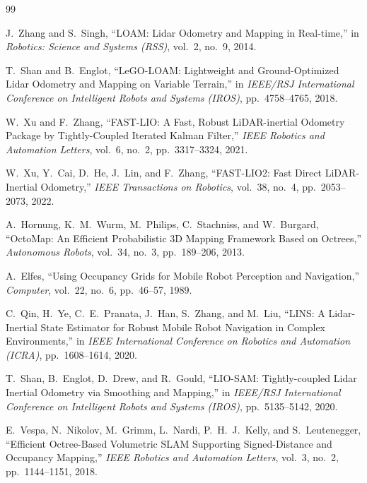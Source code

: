\documentclass[11pt,a4paper]{report}
\begin{document}
\newpage

\begin{thebibliography}{99}

J.~Zhang and S.~Singh, ``LOAM: Lidar Odometry and Mapping in Real-time,'' in \textit{Robotics: Science and Systems (RSS)}, vol.~2, no.~9, 2014.

T.~Shan and B.~Englot, ``LeGO-LOAM: Lightweight and Ground-Optimized Lidar Odometry and Mapping on Variable Terrain,'' in \textit{IEEE/RSJ International Conference on Intelligent Robots and Systems (IROS)}, pp.~4758--4765, 2018.

W.~Xu and F.~Zhang, ``FAST-LIO: A Fast, Robust LiDAR-inertial Odometry Package by Tightly-Coupled Iterated Kalman Filter,'' \textit{IEEE Robotics and Automation Letters}, vol.~6, no.~2, pp.~3317--3324, 2021.

W.~Xu, Y.~Cai, D.~He, J.~Lin, and F.~Zhang, ``FAST-LIO2: Fast Direct LiDAR-Inertial Odometry,'' \textit{IEEE Transactions on Robotics}, vol.~38, no.~4, pp.~2053--2073, 2022.

A.~Hornung, K.~M.~Wurm, M.~Philips, C.~Stachniss, and W.~Burgard, ``OctoMap: An Efficient Probabilistic 3D Mapping Framework Based on Octrees,'' \textit{Autonomous Robots}, vol.~34, no.~3, pp.~189--206, 2013.

A.~Elfes, ``Using Occupancy Grids for Mobile Robot Perception and Navigation,'' \textit{Computer}, vol.~22, no.~6, pp.~46--57, 1989.

C.~Qin, H.~Ye, C.~E.~Pranata, J.~Han, S.~Zhang, and M.~Liu, ``LINS: A Lidar-Inertial State Estimator for Robust Mobile Robot Navigation in Complex Environments,'' in \textit{IEEE International Conference on Robotics and Automation (ICRA)}, pp.~1608--1614, 2020.

T.~Shan, B.~Englot, D.~Drew, and R.~Gould, ``LIO-SAM: Tightly-coupled Lidar Inertial Odometry via Smoothing and Mapping,'' in \textit{IEEE/RSJ International Conference on Intelligent Robots and Systems (IROS)}, pp.~5135--5142, 2020.

E.~Vespa, N.~Nikolov, M.~Grimm, L.~Nardi, P.~H.~J.~Kelly, and S.~Leutenegger, ``Efficient Octree-Based Volumetric SLAM Supporting Signed-Distance and Occupancy Mapping,'' \textit{IEEE Robotics and Automation Letters}, vol.~3, no.~2, pp.~1144--1151, 2018.


\end{thebibliography}
\end{document}
